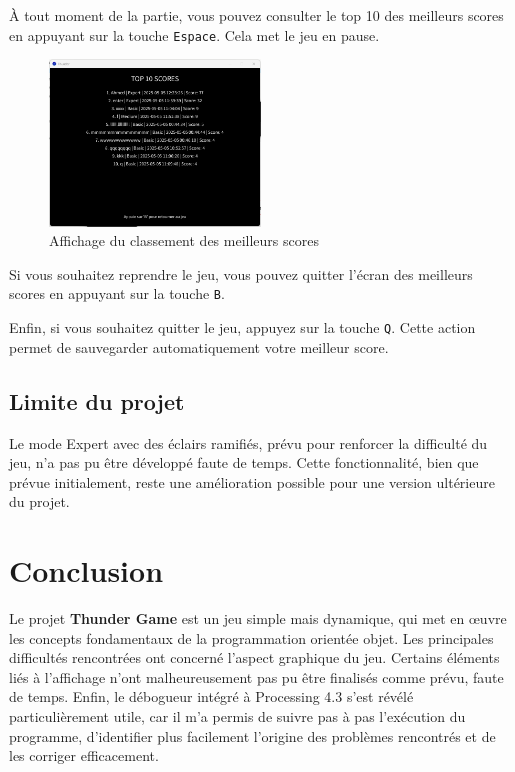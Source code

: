 \documentclass[a4paper,12pt]{article}
\begin{document}
	À tout moment de la partie, vous pouvez consulter le top 10 des meilleurs scores en appuyant sur la touche \texttt{Espace}. Cela met le jeu en pause.
	\begin{figure}[H]
		\centering
		\includegraphics[width=0.5\textwidth]{3.png}
		\caption{Affichage du classement des meilleurs scores}
	\end{figure}
	
	Si vous souhaitez reprendre le jeu, vous pouvez quitter l’écran des meilleurs scores en appuyant sur la touche \texttt{B}.
	
	\noindent Enfin, si vous souhaitez quitter le jeu, appuyez sur la touche \texttt{Q}. Cette action permet de sauvegarder automatiquement votre meilleur score.
	
	\subsection{Limite du projet}
	\noindent Le mode Expert avec des éclairs ramifiés, prévu pour renforcer la difficulté du jeu, n’a pas pu être développé faute de temps. Cette fonctionnalité, bien que prévue initialement, reste une amélioration possible pour une version ultérieure du projet.
	
	\newpage
	\section{Conclusion}
	
	Le projet \textbf{Thunder Game} est un jeu simple mais dynamique, qui met en œuvre les concepts fondamentaux de la programmation orientée objet. Les principales difficultés rencontrées ont concerné l'aspect graphique du jeu. Certains éléments liés à l'affichage n'ont malheureusement pas pu être finalisés comme prévu, faute de temps. Enfin, le débogueur intégré à Processing 4.3 s’est révélé particulièrement utile, car il m’a permis de suivre pas à pas l’exécution du programme, d’identifier plus facilement l’origine des problèmes rencontrés et de les corriger efficacement.
	
\end{document}

